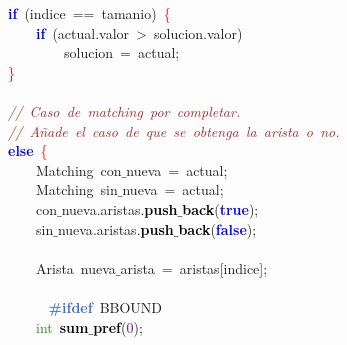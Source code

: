 \mbox{}\ \ \ \ \ \ \ \ \textbf{\textcolor{Blue}{if}}\ \textcolor{BrickRed}{(}indice\ \textcolor{BrickRed}{==}\ tamanio\textcolor{BrickRed}{)}\ \textcolor{Red}{\{} \\
\mbox{}\ \ \ \ \ \ \ \ \ \ \ \ \textbf{\textcolor{Blue}{if}}\ \textcolor{BrickRed}{(}actual\textcolor{BrickRed}{.}valor\ \textcolor{BrickRed}{\textgreater{}}\ solucion\textcolor{BrickRed}{.}valor\textcolor{BrickRed}{)} \\
\mbox{}\ \ \ \ \ \ \ \ \ \ \ \ \ \ \ \ solucion\ \textcolor{BrickRed}{=}\ actual\textcolor{BrickRed}{;} \\
\mbox{}\ \ \ \ \ \ \ \ \textcolor{Red}{\}} \\
\mbox{} \\
\mbox{}\ \ \ \ \ \ \ \ \textit{\textcolor{Brown}{//\ Caso\ de\ matching\ por\ completar.}} \\
\mbox{}\ \ \ \ \ \ \ \ \textit{\textcolor{Brown}{//\ Añade\ el\ caso\ de\ que\ se\ obtenga\ la\ arista\ o\ no.}} \\
\mbox{}\ \ \ \ \ \ \ \ \textbf{\textcolor{Blue}{else}}\ \textcolor{Red}{\{} \\
\mbox{}\ \ \ \ \ \ \ \ \ \ \ \ \textcolor{TealBlue}{Matching}\ con$\_$nueva\ \textcolor{BrickRed}{=}\ actual\textcolor{BrickRed}{;} \\
\mbox{}\ \ \ \ \ \ \ \ \ \ \ \ \textcolor{TealBlue}{Matching}\ sin$\_$nueva\ \textcolor{BrickRed}{=}\ actual\textcolor{BrickRed}{;} \\
\mbox{}\ \ \ \ \ \ \ \ \ \ \ \ con$\_$nueva\textcolor{BrickRed}{.}aristas\textcolor{BrickRed}{.}\textbf{\textcolor{Black}{push$\_$back}}\textcolor{BrickRed}{(}\textbf{\textcolor{Blue}{true}}\textcolor{BrickRed}{);} \\
\mbox{}\ \ \ \ \ \ \ \ \ \ \ \ sin$\_$nueva\textcolor{BrickRed}{.}aristas\textcolor{BrickRed}{.}\textbf{\textcolor{Black}{push$\_$back}}\textcolor{BrickRed}{(}\textbf{\textcolor{Blue}{false}}\textcolor{BrickRed}{);} \\
\mbox{} \\
\mbox{}\ \ \ \ \ \ \ \ \ \ \ \ \textcolor{TealBlue}{Arista}\ nueva$\_$arista\ \textcolor{BrickRed}{=}\ aristas\textcolor{BrickRed}{[}indice\textcolor{BrickRed}{];} \\
\mbox{} \\
\mbox{}\textbf{\textcolor{RoyalBlue}{\ \ \ \ \ \ \ \ \ \ \ \ \#ifdef}}\ BBOUND \\
\mbox{}\ \ \ \ \ \ \ \ \ \ \ \ \textcolor{ForestGreen}{int}\ \textbf{\textcolor{Black}{sum$\_$pref}}\textcolor{BrickRed}{(}\textcolor{Purple}{0}\textcolor{BrickRed}{);} \\
